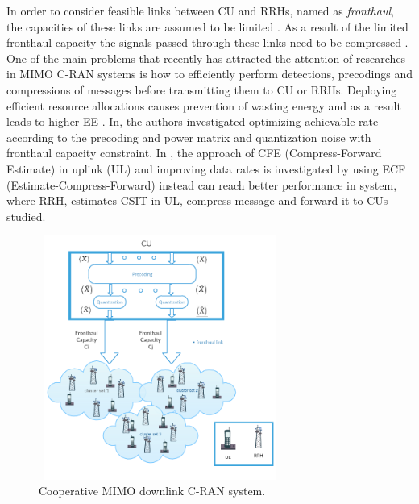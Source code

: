 \documentclass[journal,onecolumn,11pt,draftcls,doublespace]{IEEEtran}
\begin{document}
In order to consider feasible links between CU and RRHs, named as \emph{fronthaul}, the capacities of these links are assumed to be limited \cite{22,44,1111,66}. As a result of the limited fronthaul capacity the signals passed through these links need to be compressed \cite{22,44,1111,66} . One of the main problems that recently has attracted the attention of researches in MIMO C-RAN systems is how to efficiently perform detections, precodings and compressions of messages before transmitting them to CU or RRHs. Deploying efficient resource allocations causes prevention of wasting energy and as a result leads to higher EE \cite{33,55,77}. In\cite{22,44,1111,66}, the authors investigated optimizing achievable rate according to the precoding and power matrix and quantization noise with fronthaul capacity constraint. In \cite{66}, the approach of CFE (Compress-Forward Estimate) in uplink (UL) and improving data rates is investigated by using ECF (Estimate-Compress-Forward) instead can reach better performance in system, where RRH, estimates CSIT in UL, compress message and forward it to CUs studied.
\begin{figure}[t]
  \centering
    \includegraphics[width=8cm, height=8cm]{c1}
  \caption{Cooperative MIMO downlink C-RAN system.}
  \label{fig:c11}
\end{figure}
\end{document}
